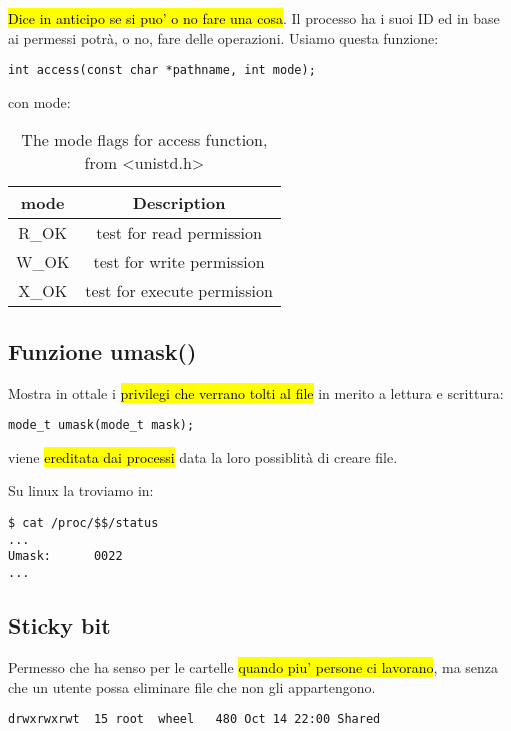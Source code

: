 \hl{Dice in anticipo se si puo' o no fare una cosa}. Il processo ha i suoi ID ed in base ai permessi potrà, o no, fare delle operazioni. Usiamo questa funzione:

\begin{lstlisting}
int access(const char *pathname, int mode);
\end{lstlisting}

con mode:

\begin{table}[!h]
	\centering
	\begin{tabular}{|c|c|}
		\hline
		\textbf{mode} & \textbf{Description} \\\hline\hline
		R\_OK & test for read permission \\
		W\_OK & test for write permission \\
		X\_OK & test for execute permission \\\hline
	\end{tabular}
	\caption{\label{tab:widgets}The mode flags for access function, from <unistd.h>}
\end{table}


\subsection{Funzione umask()}

Mostra in ottale i \hl{privilegi che verrano tolti al file} in merito a lettura e scrittura:

\begin{lstlisting}
mode_t umask(mode_t mask);
\end{lstlisting}

viene \hl{ereditata dai processi} data la loro possiblità di creare file.

Su linux la troviamo in:

\begin{lstlisting}
$ cat /proc/$$/status
...
Umask:		0022
...
\end{lstlisting}


\subsection{Sticky bit}

Permesso che ha senso per le cartelle \hl{quando piu' persone ci lavorano}, ma senza che un utente possa eliminare file che non gli appartengono.

\begin{lstlisting}
drwxrwxrwt  15 root  wheel   480 Oct 14 22:00 Shared
\end{lstlisting}

